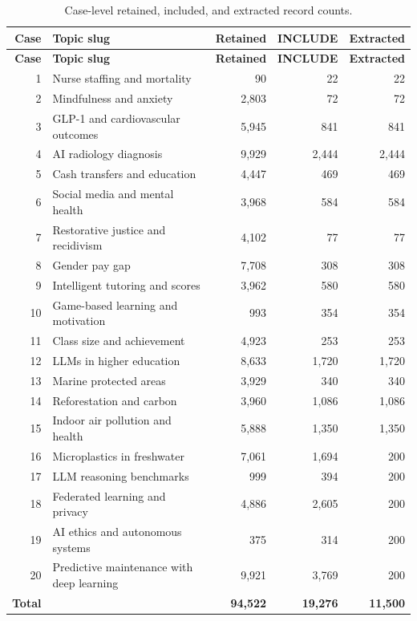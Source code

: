 \documentclass[acmsmall,anonymous,review]{acmart}
\begin{document}
\begin{longtable}{r p{} r r r}
\caption{Case-level retained, included, and extracted record counts.}\label{tab:cases}\\
\toprule
\textbf{Case} & \textbf{Topic slug} & \textbf{Retained} & \textbf{INCLUDE} & \textbf{Extracted} \\
\midrule
\endfirsthead
\toprule
\textbf{Case} & \textbf{Topic slug} & \textbf{Retained} & \textbf{INCLUDE} & \textbf{Extracted} \\
\midrule
\endhead
1 & Nurse staffing and mortality & 90 & 22 & 22 \\
2 & Mindfulness and anxiety & 2,803 & 72 & 72 \\
3 & GLP-1 and cardiovascular outcomes & 5,945 & 841 & 841 \\
4 & AI radiology diagnosis & 9,929 & 2,444 & 2,444 \\
5 & Cash transfers and education & 4,447 & 469 & 469 \\
6 & Social media and mental health & 3,968 & 584 & 584 \\
7 & Restorative justice and recidivism & 4,102 & 77 & 77 \\
8 & Gender pay gap & 7,708 & 308 & 308 \\
9 & Intelligent tutoring and scores & 3,962 & 580 & 580 \\
10 & Game-based learning and motivation & 993 & 354 & 354 \\
11 & Class size and achievement & 4,923 & 253 & 253 \\
12 & LLMs in higher education & 8,633 & 1,720 & 1,720 \\
13 & Marine protected areas & 3,929 & 340 & 340 \\
14 & Reforestation and carbon & 3,960 & 1,086 & 1,086 \\
15 & Indoor air pollution and health & 5,888 & 1,350 & 1,350 \\
16 & Microplastics in freshwater & 7,061 & 1,694 & 200 \\
17 & LLM reasoning benchmarks & 999 & 394 & 200 \\
18 & Federated learning and privacy & 4,886 & 2,605 & 200 \\
19 & AI ethics and autonomous systems & 375 & 314 & 200 \\
20 & Predictive maintenance with deep learning & 9,921 & 3,769 & 200 \\
\midrule
\textbf{Total} & & \textbf{94,522} & \textbf{19,276} & \textbf{11,500} \\
\bottomrule
\end{longtable}
\end{document}
